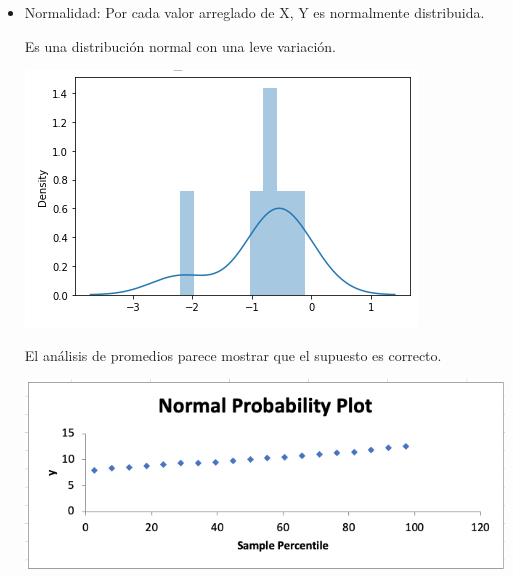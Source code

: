 \documentclass[a4paper,12pt]{article}
\begin{document}
\begin{itemize}
    \item Normalidad: Por cada valor arreglado de X, Y es normalmente distribuida. \newline\newline 
    
    Es una distribución normal con una leve variación. 
    \begin{center}
        \includegraphics[scale=0.5]{norm1.png}
    \end{center}
    El análisis de promedios parece mostrar que el supuesto es correcto.
    \begin{center}
        \includegraphics[scale=0.5]{norm2.png}
    \end{center}
\end{itemize}
\end{document}
